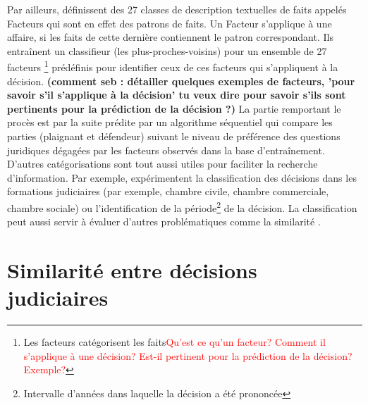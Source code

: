 Par ailleurs, \cite{Ashley2009classifCases} définissent des 27 classes de description textuelles de faits appelés \og Facteurs \fg{} qui sont en effet des patrons de faits. Un Facteur s'applique à une affaire, si les faits de cette dernière contiennent le patron correspondant.  Ils entraînent un classifieur (les plus-proches-voisins) pour un ensemble de 27 facteurs \footnote{Les facteurs catégorisent les faits\textcolor{red}{Qu'est ce qu'un facteur? Comment il s'applique à une décision? Est-il pertinent pour la prédiction de la décision? Exemple?}} prédéfinis pour identifier ceux de ces facteurs qui s'appliquent à la décision. 
\textbf{(comment seb : détailler quelques exemples de facteurs, 'pour savoir s'il s'applique à la décision' tu veux dire pour savoir s'ils sont pertinents pour la prédiction de la décision ?)} 
La partie remportant le procès est par la suite prédite par un algorithme séquentiel qui compare les parties (plaignant et défendeur) suivant le niveau de préférence des questions juridiques dégagées par les facteurs observés dans la base d'entraînement. D'autres catégorisations sont tout aussi utiles pour faciliter la recherche d'information. Par exemple, \citet{Sulea2017predictareadecision,sulea2017legalEnsSVM} expérimentent la classification des décisions dans les formations judiciaires (par exemple, chambre civile, chambre commerciale, chambre sociale) ou l'identification de la période\footnote{Intervalle d'années dans laquelle la décision a été prononcée} de la décision. 
 La classification peut aussi servir à évaluer d'autres problématiques comme la similarité \citep{ma2018wmdchinesecase}.

\section{Similarité entre décisions judiciaires}

